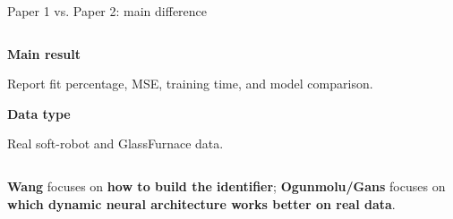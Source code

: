 \documentclass[aspectratio=169,10pt]{beamer}
\newcommand{\kw}[1]{\textcolor{Accent}{\textbf{#1}}}
\begin{document}
\begin{frame}{Paper 1 vs. Paper 2: main difference}
\begin{columns}[T,onlytextwidth]
\begin{column}{0.485\textwidth}
\begin{tcolorbox}
\vspace{0.08cm}
\textbf{Main result}\par
Report fit percentage, MSE, training time, and model comparison.

\vspace{0.08cm}
\textbf{Data type}\par
Real soft-robot and GlassFurnace data.
\end{tcolorbox}
\end{column}

\end{columns}

\vspace{0.08cm}
\begin{tcolorbox}[
enhanced,
colback=LightGray,
colframe=Accent,
colbacktitle=Accent,
coltitle=white,
title=\textbf{One-sentence takeaway},
fonttitle=\small\bfseries,
boxrule=0.7pt,
arc=1.5mm,
left=2mm,right=2mm,top=1mm,bottom=1mm,
height=0.15\textheight
]
\textbf{Wang} focuses on \kw{how to build the identifier}; \textbf{Ogunmolu/Gans} focuses on \kw{which dynamic neural architecture works better on real data}.
\end{tcolorbox}
\end{frame}
\end{document}
